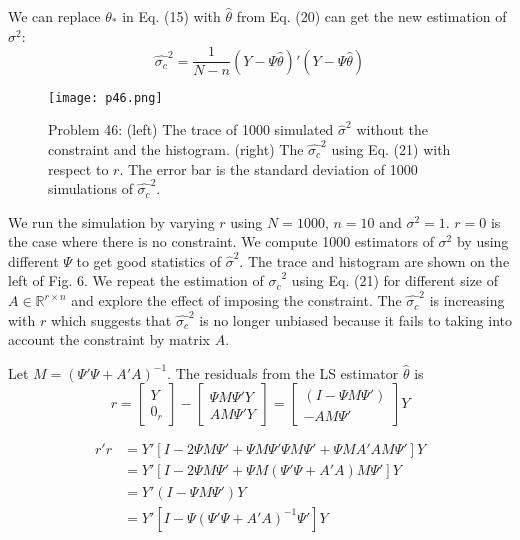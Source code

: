 \documentclass[a4paper, 11pt]{article}
\begin{document}
We can replace $\theta_*$ in Eq. (15) with $\hat{\theta}$ from Eq. (20) can get the new estimation of $\sigma^2$: 
\begin{equation}
\hat{\sigma_c}^2 = \frac{1}{N-n}(Y-\Psi\hat{\theta})'(Y-\Psi\hat{\theta})
\end{equation}

\begin{figure}
	\begin{center}
		\texttt{[image: p46.png]}
		\caption{Problem 46: (left) The trace of 1000 simulated $\hat{\sigma}^2$ without the constraint and the histogram. (right) The $\hat{\sigma_c}^2$ using Eq. (21) with respect to $r$. The error bar is the standard deviation of 1000 simulations of $\hat{\sigma_c}^2$. }
	\end{center}
\end{figure}

We run the simulation by varying $r$ using $N=1000$, $n=10$ and $\sigma^2=1$. $r=0$ is the case where there is no constraint. We compute 1000 estimators of $\sigma^2$ by using different $\Psi$ to get good statistics of $\hat{\sigma}^2$. The trace and histogram are shown on the left of Fig. 6. We repeat the estimation of $\hat{\sigma_c}^2$ using Eq. (21) for different size of $A\in \mathbb{R}^{r\times n}$ and explore the effect of imposing the constraint. The $\hat{\sigma_c}^2$ is increasing with $r$ which suggests that $\hat{\sigma_c}^2$ is no longer unbiased because it fails to taking into account the constraint by matrix $A$. 


Let $M = \left(\Psi'\Psi + A'A \right)^{-1}$. The residuals from the LS estimator $\hat{\theta}$ is 
\begin{equation}
r = \begin{bmatrix}
Y\\
0_r
\end{bmatrix} - \begin{bmatrix}
\Psi M \Psi'Y \\
AM\Psi' Y
\end{bmatrix} = \begin{bmatrix}
(I - \Psi M \Psi') \\
-AM\Psi' 
\end{bmatrix}Y
\end{equation}

\begin{equation}
\begin{split}
r'r & = Y'\left[I - 2\Psi M\Psi' + \Psi M\Psi' \Psi M\Psi' + \Psi MA'A M\Psi' \right]Y \\
& = Y'\left[I - 2\Psi M\Psi' + \Psi M(\Psi'\Psi + A'A)M\Psi' \right]Y \\
& = Y'(I - \Psi M\Psi')Y \\
& = Y' \left[I - \Psi\left(\Psi'\Psi + A'A \right)^{-1}\Psi' \right]Y
\end{split}
\end{equation}
\end{document}
